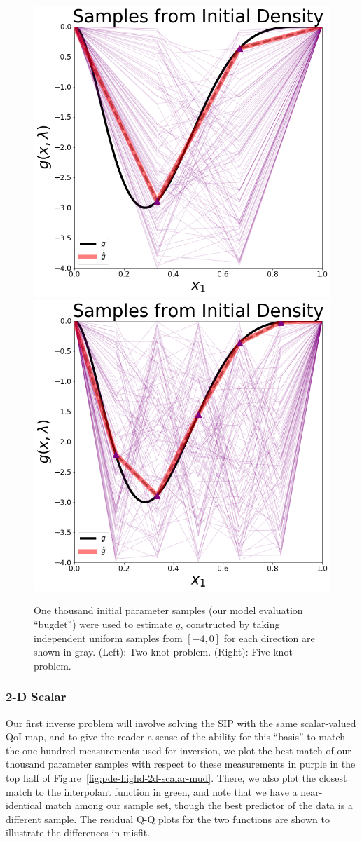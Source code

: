 \begin{figure}[htbp]
\centering
  \includegraphics[width=0.475\linewidth]{figures/pde-highd/pde-highd_init_D2}
  \includegraphics[width=0.475\linewidth]{figures/pde-highd/pde-highd_init_D5}
\caption{
One thousand initial parameter samples (our model evaluation ``bugdet'') were used to estimate $g$, constructed by taking independent uniform samples from $[-4, 0]$ for each direction are shown in gray. (Left): Two-knot problem. (Right): Five-knot problem.
}
\label{fig:pde-highd-initial}
\end{figure}

\subsubsection{2-D Scalar}

Our first inverse problem will involve solving the SIP with the same scalar-valued QoI map, and to give the reader a sense of the ability for this ``basis'' to match the one-hundred measurements used for inversion, we plot the best match of our thousand parameter samples with respect to these measurements in purple in the top half of Figure~\ref{fig:pde-highd-2d-scalar-mud}.
There, we also plot the closest match to the interpolant function in green, and note that we have a near-identical match among our sample set, though the best predictor of the data is a different sample.
The residual Q-Q plots for the two functions are shown to illustrate the differences in misfit.


